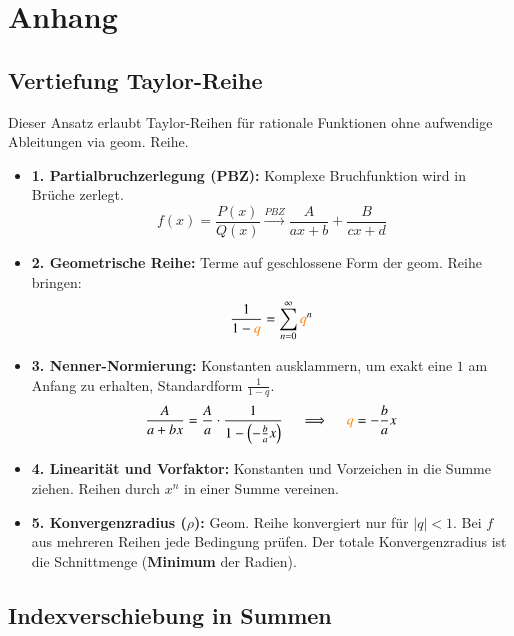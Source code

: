 \section{Anhang}
\subsection{Vertiefung Taylor-Reihe}

Dieser Ansatz erlaubt Taylor-Reihen für rationale Funktionen ohne aufwendige Ableitungen via geom. Reihe.
\begin{itemize}
    \item \textbf{1. Partialbruchzerlegung (PBZ):} Komplexe Bruchfunktion wird in Brüche zerlegt.
    \begin{equation*}
        f(x) = \frac{P(x)}{Q(x)} \xrightarrow{PBZ} \frac{A}{ax+b} + \frac{B}{cx+d}
    \end{equation*}

    \item \textbf{2. Geometrische Reihe:} Terme auf geschlossene Form der geom. Reihe bringen:
    \begin{equation*}
        \frac{1}{1-{\color{orange}q}} = \sum_{n=0}^{\infty} {\color{orange}q}^n
    \end{equation*}

    \item \textbf{3. Nenner-Normierung:} Konstanten ausklammern, um exakt eine $1$ am Anfang zu erhalten, Standardform $\frac{1}{1-q}$.
    \begin{equation*}
        \frac{A}{a+bx} = \frac{A}{a} \cdot \frac{1}{1 - \left(-\frac{b}{a}x\right)} \quad \implies \quad {\color{orange}q} = -\frac{b}{a}x
    \end{equation*}

    \item \textbf{4. Linearität und Vorfaktor:} Konstanten und Vorzeichen in die Summe ziehen. Reihen durch $x^n$ in einer Summe vereinen.

    \item \textbf{5. Konvergenzradius ($\rho$):} Geom. Reihe konvergiert nur für $|q| < 1$. Bei $f$ aus mehreren Reihen jede Bedingung prüfen. Der totale Konvergenzradius ist die Schnittmenge (\textbf{Minimum} der Radien).
\end{itemize}

\subsection{Indexverschiebung in Summen}

